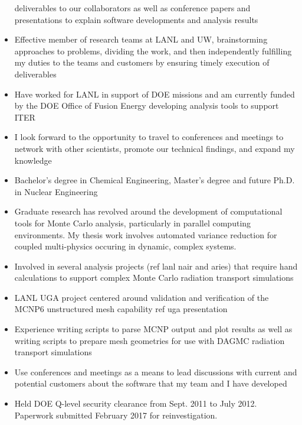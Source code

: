 \documentclass[a4paper,10pt]{article}
\begin{document}
\begin{itemize}[leftmargin=.9in,rightmargin=.875in,itemsep=1.6mm]
			deliverables to our collaborators as well as conference
			papers and presentations to explain software
			developments and analysis results
		\item Effective member of research teams at LANL and
			UW, brainstorming approaches to problems, dividing the
			work, and then independently fulfilling my duties to the teams and
			customers by ensuring timely execution of deliverables
		\item  Have worked for LANL in support of DOE missions and am
			currently funded by the DOE Office of Fusion Energy
			developing analysis tools to support ITER 
		\item I look forward to the opportunity to travel to
			conferences and meetings to network with other
			scientists, promote our technical
			findings, and expand my knowledge
               \item Bachelor's degree in Chemical Engineering, Master's degree
		       and future Ph.D. in Nuclear Engineering
	       \item Graduate research has revolved around the development of
		       computational tools for Monte Carlo analysis,
		       particularly in parallel computing environments.  My
		       thesis work involves automated variance reduction for
		       coupled multi-physics occuring in dynamic, complex
		       systems.
	       \item Involved in several analysis projects (ref lanl
			       nair and aries) that require
			      hand calculations to support complex Monte
			      Carlo radiation transport simulations
	       \item LANL UGA project centered around validation and
		       verification of the MCNP6 unstructured mesh
		       capability ref uga presentation
	       \item Experience writing scripts to parse MCNP output
	               and plot results as well as writing scripts to
		       prepare mesh geometries for use with DAGMC
		       radiation transport simulations
	       \item Use conferences and meetings as a means to lead
		       discussions with current and potential customers about
		       the software that my team and I have developed
              \item Held DOE Q-level security clearance from Sept. 2011 to July
		      2012. Paperwork submitted February 2017 for
		      reinvestigation.


\end{itemize} 
\end{document}
